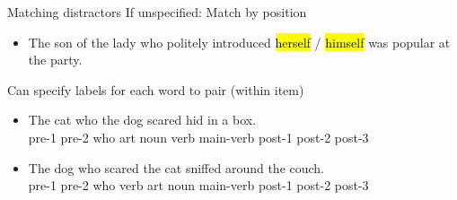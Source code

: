 \documentclass[12pt, xcolor=beamer,table,usenames,dvipsnames, ignorenonframetext, ngerman,t]{beamer}
\makeatletter
\let\HL\hl
\renewcommand\hl{%
	\let\set@color\beamerorig@set@color
	\let\reset@color\beamerorig@reset@color
	\HL}
\makeatother
\begin{document}
\begin{frame}{Matching distractors}
	If unspecified: Match by position
	\begin{itemize}
		\item The son of the lady who politely introduced  \hl{herself} / \hl{himself} was popular at the party.
	\end{itemize}
	Can specify labels for each word to pair (within item)
	\begin{itemize}
		\item The cat who the dog scared hid in a box.\\pre-1 pre-2 who art noun verb main-verb post-1 post-2 post-3
		\item The dog who scared the cat sniffed around the couch.\\ pre-1 pre-2 who verb art noun main-verb post-1 post-2 post-3
	\end{itemize}
\end{frame}
\end{document}
